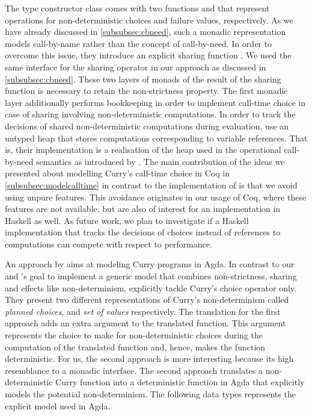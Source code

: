 The type constructor class  comes with two functions  and  that represent operations for non-deterministic choices and failure values, respectively.
As we have already discussed in \autoref{subsubsec:cbneed}, such a monadic representation models call-by-name rather than the  concept of call-by-need.
In order to overcome this issue, they introduce an explicit sharing function .
We used the same interface for the sharing operator in our approach as discussed in \autoref{subsubsec:cbneed}.
These two layers of monads of the result of the sharing function is necessary to retain the non-strictness property.
The first monadic layer additionally performs bookkeeping in order to implement call-time choice in case of sharing involving non-deterministic computations.
In order to track the decisions of shared non-deterministic computations during evaluation, \citeauthor{fischer2009purely} use an untyped heap that stores computations corresponding to variable references.
That is, their implementation is a realisation of the heap used in the operational call-by-need semantics as introduced by \citet{launchbury1993natural}.
The main contribution of the ideas we presented about modelling Curry's call-time choice in Coq in \autoref{subsubsec:modelcalltime} in contrast to the implementation of \citeauthor{fischer2009purely} is that we avoid using unpure features.
This avoidance originates in our usage of Coq, where these features are not available, but are also of interest for an implementation in Haskell as well.
As future work, we plan to investigate if a Haskell implementation that tracks the decisions of choices instead of references to computations can compete with respect to performance.

An approach by \citet{antoy2017proving} aims at modeling Curry programs in Agda.
In contrast to our and \citeauthor{fischer2009purely}'s goal to implement a generic model that combines non-strictness, sharing and effects like non-determinism, \citeauthor{antoy2017proving} explicitly tackle Curry's choice operator only.
They present two different representations of Curry's non-determinism called \emph{planned choices}, and \emph{set of values} respectively.
The translation for the first approach adds an extra argument to the translated function.
This argument represents the choice to make for non-deterministic choices during the computation of the translated function and, hence, makes the function deterministic.
For us, the second approach is more interesting because its high resemblance to a monadic interface.
The second approach translates a non-deterministic Curry function into a deterministic function in Agda that explicitly models the potential non-determinism.
The following data types represents the explicit model used in Agda.

